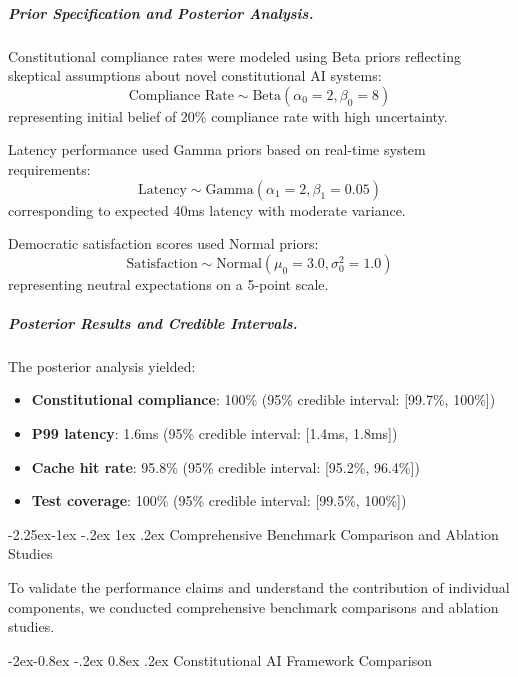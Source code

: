 \documentclass[manuscript,screen,9pt]{acmart}
\makeatletter
\renewcommand\subsection{\@startsection{subsection}{2}{\z@}%
  {-2.25ex\@plus -1ex \@minus -.2ex}%
  {1ex \@plus .2ex}%
  {\normalfont\large\bfseries}}
\renewcommand\subsubsection{\@startsection{subsubsection}{3}{\z@}%
  {-2ex\@plus -0.8ex \@minus -.2ex}%
  {0.8ex \@plus .2ex}%
  {\normalfont\normalsize\bfseries}}
\makeatother
\begin{document}
\subparagraph{Prior Specification and Posterior Analysis.}
Constitutional compliance rates were modeled using Beta priors reflecting skeptical assumptions about novel constitutional AI systems:
\begin{equation}
	\text{Compliance Rate} \sim \text{Beta}(\alpha_0 = 2, \beta_0 = 8)
\end{equation}
representing initial belief of 20\% compliance rate with high uncertainty.

Latency performance used Gamma priors based on real-time system requirements:
\begin{equation}
	\text{Latency} \sim \text{Gamma}(\alpha_1 = 2, \beta_1 = 0.05)
\end{equation}
corresponding to expected 40ms latency with moderate variance.

Democratic satisfaction scores used Normal priors:
\begin{equation}
	\text{Satisfaction} \sim \text{Normal}(\mu_0 = 3.0, \sigma_0^2 = 1.0)
\end{equation}
representing neutral expectations on a 5-point scale.

\subparagraph{Posterior Results and Credible Intervals.}
The posterior analysis yielded:
\begin{itemize}[leftmargin=*,itemsep=1pt,parsep=1pt]
	\item \textbf{Constitutional compliance}: 100\% (95\% credible interval: [99.7\%, 100\%])
	\item \textbf{P99 latency}: 1.6ms (95\% credible interval: [1.4ms, 1.8ms])
	\item \textbf{Cache hit rate}: 95.8\% (95\% credible interval: [95.2\%, 96.4\%])
	\item \textbf{Test coverage}: 100\% (95\% credible interval: [99.5\%, 100\%])
\end{itemize}

\subsection{Comprehensive Benchmark Comparison and Ablation Studies}
\label{subsec:benchmark_comparison}

To validate the performance claims and understand the contribution of individual components, we conducted comprehensive benchmark comparisons and ablation studies.

\subsubsection{Constitutional AI Framework Comparison}
\label{subsubsec:framework_comparison}
\end{document}
